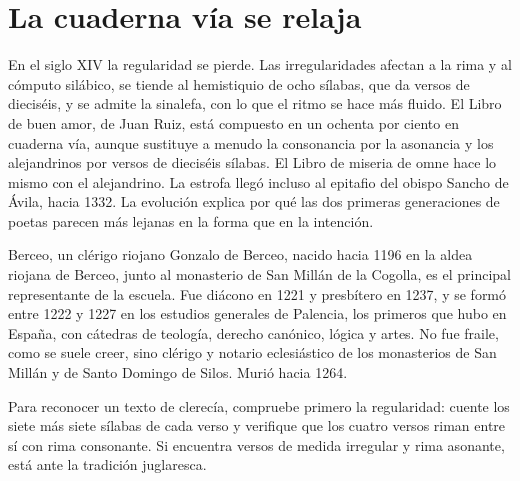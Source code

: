 \documentclass{book}
\begin{document}

\section{La cuaderna vía se relaja}

En el siglo XIV la regularidad se pierde. Las irregularidades afectan a la rima y al cómputo silábico, se tiende al hemistiquio de ocho sílabas, que da versos de dieciséis, y se admite la sinalefa, con lo que el ritmo se hace más fluido. El Libro de buen amor, de Juan Ruiz, está compuesto en un ochenta por ciento en cuaderna vía, aunque sustituye a menudo la consonancia por la asonancia y los alejandrinos por versos de dieciséis sílabas. El Libro de miseria de omne hace lo mismo con el alejandrino. La estrofa llegó incluso al epitafio del obispo Sancho de Ávila, hacia 1332. La evolución explica por qué las dos primeras generaciones de poetas parecen más lejanas en la forma que en la intención.


\begin{tcolorbox}[title={Consejo}, studiumtip, breakable]

Berceo, un clérigo riojano
Gonzalo de Berceo, nacido hacia 1196 en la aldea riojana de Berceo, junto al monasterio de San Millán de la Cogolla, es el principal representante de la escuela. Fue diácono en 1221 y presbítero en 1237, y se formó entre 1222 y 1227 en los estudios generales de Palencia, los primeros que hubo en España, con cátedras de teología, derecho canónico, lógica y artes. No fue fraile, como se suele creer, sino clérigo y notario eclesiástico de los monasterios de San Millán y de Santo Domingo de Silos. Murió hacia 1264.


Para reconocer un texto de clerecía, compruebe primero la regularidad: cuente los siete más siete sílabas de cada verso y verifique que los cuatro versos riman entre sí con rima consonante. Si encuentra versos de medida irregular y rima asonante, está ante la tradición juglaresca.

\end{tcolorbox}
\end{document}
